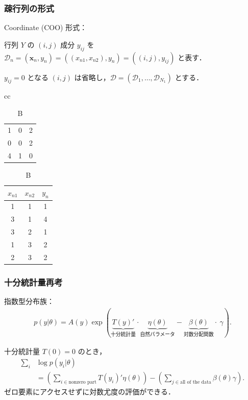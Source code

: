 \documentclass[dvipdfmx, dvipsnames]{beamer}
\begin{document}
\begin{frame} 
\frametitle{疎行列の形式}

Coordinate (COO) 形式：

行列 $Y$ の $(i,j)$ 成分 $y_{ij}$ を $ \mathcal{D}_n = (\boldsymbol{x}_n, y_n)= ((x_{n1}, x_{n2}),y_{n})= ((i, j),y_{ij})$ と表す．

$y_{ij}=0$ となる $(i,j)$ は省略し，$\mathcal{D}=(\mathcal{D}_1, \ldots, \mathcal{D}_{N_1})$ とする．

\begin{table}[tbp]
\centering
\caption{COO形式：BはAと同じ情報を持つ}
\begin{tabular}{cc}
\begin{minipage}{0.3\linewidth}
\centering
{
\caption{A}
\begin{tabular}{|ccc|}
\hline
1 & 0 & 2\\
0 & 0 & 2\\
4 & 1 & 0\\
\hline
\end{tabular}
}
\end{minipage}
\begin{minipage}{0.3\linewidth}
\centering
{
\caption{B}
\begin{tabular}{ccc}
\hline
$x_{n1}$ & $x_{n2}$ & $y_n$\\
\hline
1 & 1 & 1\\
3 & 1 & 4\\
3 & 2 & 1\\
1 & 3 & 2\\
2 & 3 & 2\\
\hline
\end{tabular}
}
\end{minipage}
\end{tabular}
\end{table}
 \end{frame}
 
\begin{frame} 
\frametitle{十分統計量再考}

指数型分布族：
\begin{align*}
p(y|\theta) = A(y) \exp(\underbrace{T(y)'}_{\text{十分統計量}} \cdot\underbrace{\eta(\theta)}_{\text{自然パラメータ}} -  \underbrace{\beta(\theta)}_{\text{対数分配関数}} \cdot \ \gamma) .
\end{align*}

十分統計量 $T(0)=0$ のとき，
\begin{align*}
\sum_i &\log p(y_i|\theta) \\
&= \left(\sum_{i \in \text{nonzero part}}T(y_i)'  \eta(\theta)\right) - \left(\sum_{j \in \text{all of the data}}{\beta(\theta) \gamma } \right).
\end{align*}
ゼロ要素にアクセスせずに対数尤度の評価ができる．
\end{frame}
\end{document}
